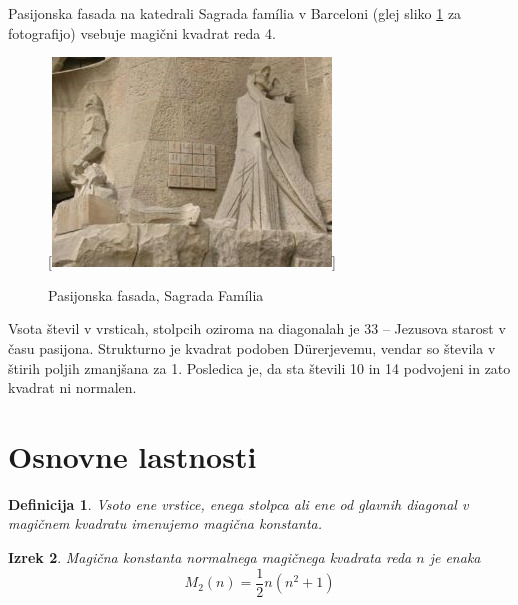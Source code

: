 \documentclass[a4paper,12pt]{article}
\newcommand{\pojem}[1]{\emph{\color{purple}#1}}
\newtheorem{izrek}{Izrek}[section]
\newtheorem{definicija}[izrek]{Definicija}
\begin{document}
Pasijonska fasada na katedrali Sagrada família v Barceloni
(glej sliko \ref{fig:sagrada} za fotografijo) vsebuje magični kvadrat reda 4.
\begin{figure}[!ht]
   \centering
   \caption{Pasijonska fasada, Sagrada Família}
   [\includegraphics{sagrada.png}]
   \label{fig:sagrada}
\end{figure}

Vsota števil v vrsticah, stolpcih oziroma na diagonalah je 33 -- Jezusova starost
v času pasijona. Strukturno je kvadrat podoben Dürerjevemu, vendar so števila
v štirih poljih zmanjšana za 1. Posledica je, da sta števili 10 in 14 podvojeni
in zato kvadrat ni normalen.
%


\section{Osnovne lastnosti}

\begin{definicija}
      Vsoto ene vrstice, enega stolpca ali ene od glavnih diagonal
      v magičnem kvadratu imenujemo \pojem{magična konstanta}.
\end{definicija}

   
   \begin{izrek}
      Magična konstanta normalnega magičnega kvadrata reda $n$
      je enaka
      \begin{equation}
         \label{eq:mc}
         M_2(n) = \frac{1}{2} n(n^2+1)
      \end{equation}
   \end{izrek}
\end{document}
